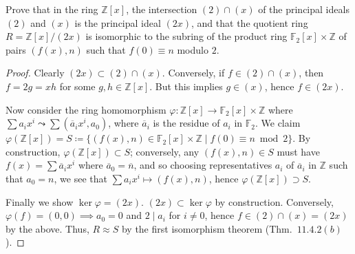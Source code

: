 \documentclass[12pt]{article}
\theoremstyle{remark}
\begin{document}
\begin{problem}
  Prove that in the ring $\mathbb{Z}[x]$, the intersection $(2) \cap (x)$ of the principal ideals $(2)$ and $(x)$ is the principal ideal $(2x)$, and that the quotient ring $R = \mathbb{Z}[x]/(2x)$ is isomorphic to the subring of the product ring $\mathbb{F}_2[x] \times \mathbb{Z}$ of pairs $(f(x),n)$ such that $f(0) \equiv n$ modulo $2$.
\end{problem}
\begin{proof}
  Clearly $(2x) \subset (2) \cap (x)$. Conversely, if $f \in (2) \cap (x)$, then $f = 2g = xh$ for some $g,h \in \mathbb{Z}[x]$. But this implies $g \in (x)$, hence $f \in (2x)$.
  \par Now consider the ring homomorphism $\varphi\colon\mathbb{Z}[x] \to \mathbb{F}_2[x] \times \mathbb{Z}$ where $\sum a_ix^i \leadsto \sum (\overline{a}_ix^i,a_0)$, where $\overline{a}_i$ is the residue of $a_i$ in $\mathbb{F}_2$. We claim $\varphi(\mathbb{Z}[x]) = S \coloneqq \{(f(x),n) \in \mathbb{F}_2[x] \times \mathbb{Z} \mid f(0) \equiv n \bmod 2\}$. By construction, $\varphi(\mathbb{Z}[x]) \subset S$; conversely, any $(f(x),n) \in S$ must have $f(x) = \sum \overline{a}_ix^i$ where $\overline{a}_0 = \overline{n}$, and so choosing representatives $a_i$ of $\overline{a}_i$ in $\mathbb{Z}$ such that $a_0 = n$, we see that $\sum a_ix^i \mapsto (f(x),n)$, hence $\varphi(\mathbb{Z}[x]) \supset S$.
  \par Finally we show $\ker \varphi = (2x)$. $(2x) \subset \ker \varphi$ by construction. Conversely, $\varphi(f) = (0,0) \implies a_0 = 0$ and $2 \mid a_i$ for $i \ne 0$, hence $f \in (2) \cap (x) = (2x)$ by the above. Thus, $R \approx S$ by the first isomorphism theorem (Thm.~$11.4.2(b)$).
\end{proof}
\end{document}
